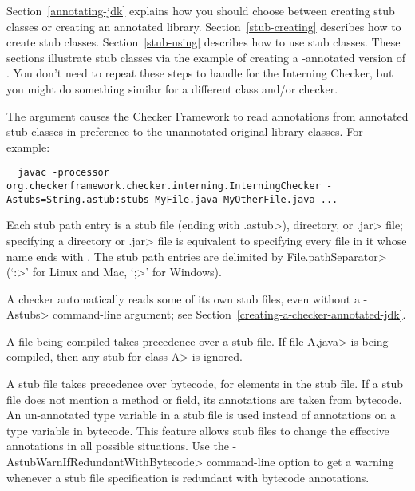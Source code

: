 Section~\ref{annotating-jdk} explains how you should choose between
creating stub classes or creating an annotated library.
Section~\ref{stub-creating} describes how to create stub classes.
Section~\ref{stub-using} describes how to use stub classes.
These sections illustrate stub classes via the example of creating a -annotated
version of .  You don't need to repeat these steps
to handle  for the Interning Checker,
but you might do something similar for a different class and/or checker.



The  argument causes the Checker Framework to read
annotations from annotated stub classes in preference to the unannotated
original library classes.  For example:

\begin{myxsmall}
\begin{Verbatim}
  javac -processor org.checkerframework.checker.interning.InterningChecker -Astubs=String.astub:stubs MyFile.java MyOtherFile.java ...
\end{Verbatim}
\end{myxsmall}

Each stub path entry is a stub file (ending with \<.astub>), directory, or
\<.jar> file; specifying a directory or \<.jar> file is
equivalent to specifying every file in it whose name ends with
.  The stub path entries are delimited by
\<File.pathSeparator> (`\<:>' for Linux and Mac, `\<;>' for Windows).

A checker automatically reads some of its own stub files, even without a
\<-Astubs> command-line argument; see
Section~\ref{creating-a-checker-annotated-jdk}.



A file being compiled takes precedence over a stub file.  If file \<A.java>
is being compiled, then any stub for class \<A> is ignored.

A stub file takes precedence over bytecode, for elements in the stub file.
If a stub file does not mention a method or field, its annotations are
taken from bytecode.
An un-annotated type variable in a stub file is used instead of
annotations on a type variable in bytecode.
This feature allows stub files to change the effective annotations in
all possible situations.
Use the \<-AstubWarnIfRedundantWithBytecode> command-line option to get
a warning whenever a stub file specification is redundant with
bytecode annotations.


